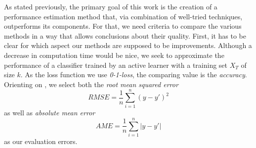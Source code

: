 As stated previously, the primary goal of this work is the creation of a performance estimation method that, via combination of well-tried techniques, outperforms its components. For that, we need criteria to compare the various methods in a way that allows conclusions about their quality. First, it has to be clear for which aspect our methods are supposed to be improvements. Although a decrease in computation time would be nice, we seek to approximate the performance of a classifier trained by an active learner with a training set $X_T$ of size $k$. As the loss function we use \textit{0-1-loss}, the comparing value is the \textit{accuracy}. Orienting on \cite{AirolaEtAl2001}, we select both the \textit{root mean squared error}
\begin{equation}
RMSE = \frac{1}{n} \sum_{i=1}^{n} \left(y - y'\right)^2
\end{equation}
as well as \textit{absolute mean error}
\begin{equation}
AME = \frac{1}{n} \sum_{i=1}^{n} \left|y - y'\right|
\end{equation}
as our evaluation errors.

